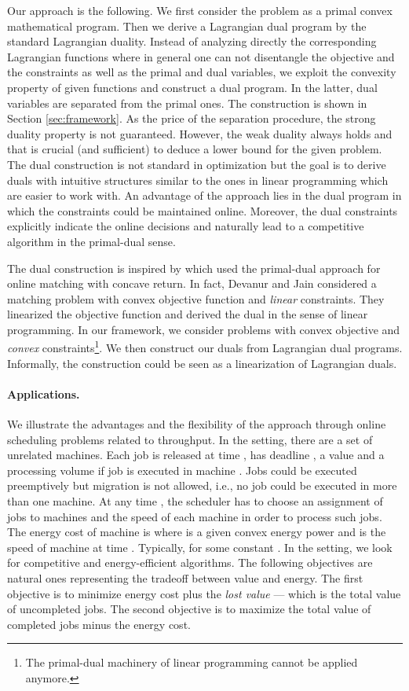 \documentclass[11pt]{article}
\begin{document}
Our approach is the following. We first consider the problem as a primal convex mathematical program. 
Then we derive a Lagrangian dual program by the standard Lagrangian duality. 
Instead of analyzing directly the corresponding Lagrangian functions
where in general one can not disentangle the objective and the constraints
as well as the primal and dual variables,
we exploit the convexity property of given functions and construct 
a dual program. In the latter, dual variables are separated from the primal ones. 
The construction is shown in Section \ref{sec:framework}.
As the price of the separation procedure, the strong duality 
property is not guaranteed. However, the weak duality always holds and that is 
crucial (and sufficient) to deduce a lower bound for the given problem.
The dual construction is not standard in optimization but the goal is to derive 
duals with intuitive structures similar to the ones in linear programming which 
are easier to work with.
An advantage of the approach lies in the dual program
in which the constraints could be maintained online. Moreover, the dual constraints 
explicitly indicate the online decisions and naturally lead to a competitive algorithm
in the primal-dual sense.   

The dual construction is inspired by \cite{DevanurJain12:Online-matching}
which used the primal-dual approach for online
matching with concave return. In fact, Devanur and Jain \cite{DevanurJain12:Online-matching}
considered a matching problem with convex objective function and \emph{linear} constraints.
They linearized the objective function and derived the dual in the sense of linear programming. 
In our framework, we consider problems with convex objective and 
\emph{convex} constraints\footnote{The primal-dual machinery of linear programming cannot be applied anymore.}. 
We then construct our duals from Lagrangian dual programs. 
Informally, the construction could be seen as a linearization of Lagrangian duals. 

\paragraph{Applications.}	 We illustrate the advantages and the flexibility of the approach through 
online scheduling problems related to throughput. In the setting, there are a set of 
unrelated machines. Each job  is released at time , has deadline , a value  and 
a processing volume  if job  is executed in machine . 
Jobs could be executed preemptively but migration is not allowed, 
i.e., no job could be executed in more than one machine. At any time , the scheduler 
has to choose an assignment of jobs to machines and the speed of each machine 
in order to process such jobs. The energy cost of machine  is 
 where  is a given convex energy power and 
is the speed of machine  at time . Typically,  for some constant . 
In the setting, we look for competitive and energy-efficient algorithms. The following objectives 
are natural ones representing the tradeoff between value and energy. 
The first objective is to minimize energy cost plus the \emph{lost value} 
--- which is the total value of uncompleted jobs. The second objective is to maximize 
 the total value of completed jobs minus the energy cost.
\end{document}

